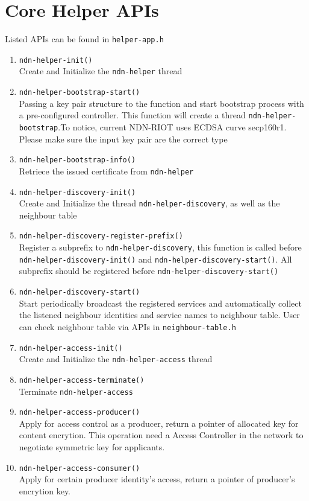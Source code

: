 \documentclass[a4paper, 11pt]{article}
\begin{document}
    \section*{Core Helper APIs}
    Listed APIs can be found in \texttt{helper-app.h}
    \begin{enumerate}
    \item \texttt{ndn-helper-init()} \\
    Create and Initialize the \texttt{ndn-helper} thread 
    \item \texttt{ndn-helper-bootstrap-start()} \\
    Passing a key pair structure to the function and start bootstrap process with a pre-configured controller. This function will create a thread \texttt{ndn-helper-bootstrap}.To notice, current NDN-RIOT uses ECDSA curve secp160r1. Please make sure the input key pair are the correct type
    \item \texttt{ndn-helper-bootstrap-info()} \\ 
    Retriece the issued certificate from \texttt{ndn-helper}
    \item \texttt{ndn-helper-discovery-init()} \\
    Create and Initialize the thread \texttt{ndn-helper-discovery}, as well as the neighbour table
    \item \texttt{ndn-helper-discovery-register-prefix()} \\
    Register a subprefix to \texttt{ndn-helper-discovery}, this function is called before \texttt{ndn-helper-discovery-init()} and \texttt{ndn-helper-discovery-start()}. All subprefix should be registered before \texttt{ndn-helper-discovery-start()}
    \item \texttt{ndn-helper-discovery-start()} \\
    Start periodically broadcast the registered services and automatically collect the listened neighbour identities and service names to neighbour table. User can check neighbour table via APIs in \texttt{neighbour-table.h}
    \item \texttt{ndn-helper-access-init()} \\
    Create and Initialize the \texttt{ndn-helper-access} thread 
    \item \texttt{ndn-helper-access-terminate()} \\
    Terminate \texttt{ndn-helper-access}
    \item \texttt{ndn-helper-access-producer()} \\
    Apply for access control as a producer, return a pointer of allocated key for content encrytion. This operation need a Access Controller in the network to negotiate symmetric key for applicants.
    \item \texttt{ndn-helper-access-consumer()} \\
    Apply for certain producer identity's access, return a pointer of producer's encrytion key.
    \end{enumerate}
    
    
    
\end{document}
